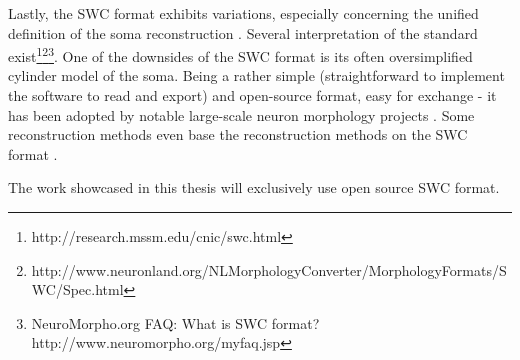 Lastly, the SWC format exhibits variations, especially concerning the unified definition of the soma reconstruction \cite{bakker2016web}. Several interpretation of the standard exist\footnote{http://research.mssm.edu/cnic/swc.html}\footnote{http://www.neuronland.org/NLMorphologyConverter/MorphologyFormats/SWC/Spec.html}\footnote{NeuroMorpho.org FAQ: What is SWC format? http://www.neuromorpho.org/myfaq.jsp}. One of the downsides of the SWC format is its often oversimplified cylinder model of the soma. Being a rather simple (straightforward to implement the software to read and export) and open-source format, easy for exchange - it has been adopted by notable large-scale neuron morphology projects \cite{ascoli2007neuromorpho,peng2015bigneuron}. Some reconstruction methods even base the reconstruction methods on the SWC format \cite{feng2015neutube}.

The work showcased in this thesis will exclusively use open source SWC format.
 
